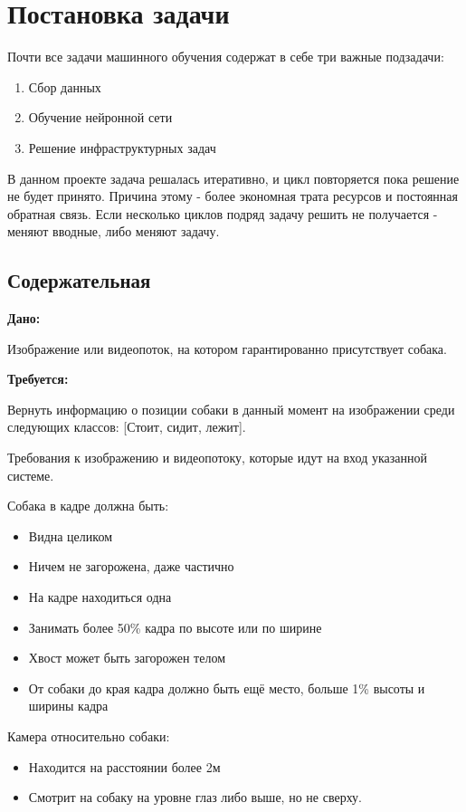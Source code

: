 \chapter{Постановка задачи} \label{chapt2}

Почти все задачи машинного обучения содержат в себе три важные подзадачи:
\begin{enumerate}
    \item Сбор данных
    \item Обучение нейронной сети
    \item Решение инфраструктурных задач
\end{enumerate}

В данном проекте задача решалась итеративно, и цикл повторяется пока решение не будет принято. Причина этому - более экономная трата ресурсов и постоянная обратная связь. Если несколько циклов подряд задачу решить не получается - меняют вводные, либо меняют задачу. 

\section{Содержательная} \label{sect2_1}
\textbf{Дано: } 

Изображение или видеопоток, на котором гарантированно присутствует собака.

\textbf{Требуется: } 

Вернуть информацию о позиции собаки в данный момент на изображении среди следующих классов: [Стоит, сидит, лежит].

Требования к изображению и видеопотоку, которые идут на вход указанной системе. 

Собака в кадре должна быть:
\begin{itemize}
    \item Видна целиком
    \item Ничем не загорожена, даже частично
    \item На кадре находиться одна
    \item Занимать более 50\% кадра по высоте или по ширине
    \item Хвост может быть загорожен телом 
    \item От собаки до края кадра должно быть ещё место, больше 1\% высоты и ширины кадра
 \end{itemize}
 
Камера относительно собаки:
\begin{itemize}
    \item Находится на расстоянии более 2м
    \item Смотрит на собаку на уровне глаз либо выше, но не сверху.
\end{itemize}

